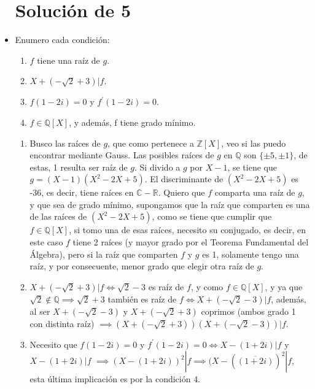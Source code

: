 \documentclass[12pt,twoside,a4paper]{exam}
\begin{document}
\begin{itemize}
\section*{Solución de 5}
\item Enumero cada condición:
    \begin{enumerate}
      \item $f$ tiene una raíz de $g$.
      \item $X+(-\sqrt{2}+3) | f$.
      \item $f(1-2i)=0$ y $f^{'}(1-2i)=0$.
      \item $f \in \mathbb{Q}[X]$, y además, f tiene grado mínimo.
    \end{enumerate}

    \begin{enumerate}
      \item Busco las raíces de $g$, que como pertenece a $\mathbb{Z}[X]$, veo si
            las puedo encontrar mediante Gauss. Las posibles raíces de $g$ en 
            $\mathbb{Q}$ son  $\{\pm 5, \pm 1\}$, de estas, 1 resulta ser raíz
            de $g$. Si divido a $g$ por $X-1$, se tiene que $g=(X-1)(X^2-2X+5)$.
            El discriminante de $(X^2-2X+5)$ es -36, es decir, tiene raíces en
            $\mathbb{C}-\mathbb{R}$. Quiero que $f$ comparta una raíz de $g$,
            y que sea de grado mínimo, supongamos que la raíz que comparten es
            una de las raíces de $(X^2-2X+5)$, como se tiene que cumplir que
            $ f \in \mathbb{Q}[X]$, si tomo una de esas raíces, necesito su 
            conjugado, es decir, en este caso $f$ tiene 2 raíces (y mayor grado
            por el Teorema Fundamental del Álgebra), pero si la raíz que comparten 
            $f$ y $g$ es 1, solamente tengo una raíz, y por consecuente, menor 
            grado que elegir otra raíz de $g$.
      \item $X+(-\sqrt{2}+3) | f \iff \sqrt{2}-3$ es raíz de $f$, y como $ f \in 
            \mathbb{Q}[X]$, y ya que $\sqrt{2} \notin \mathbb{Q} \implies  \sqrt{2}+3$
            también es raíz de $f \iff X+(-\sqrt{2}-3) | f$, además, al ser 
            $X+(-\sqrt{2}-3)$ y $X+(-\sqrt{2}+3)$ coprimos (ambos grado 1 con 
            distinta raíz) $\implies (X+(-\sqrt{2}+3))(X+(-\sqrt{2}-3))|f$.
      \item Necesito que $f(1-2i)=0$ y $f^{'}(1-2i)=0 \iff X-(1+2i)|f$ y $X-(1+2i)|f$  
            $\implies (X-(1+2i))^2|f \implies (X-(\overline{(1+2i)})^2|f$, esta 
            última implicación es por la condición 4.
        \end{enumerate}

\end{itemize}
\end{document}
